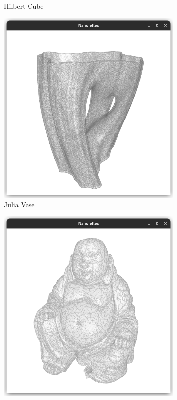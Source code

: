 \documentclass{stdlocal}
\begin{document}
\begin{figure}[t]
\begin{subfigure}[b]{0.23\linewidth}
      \caption{Hilbert Cube}
    \end{subfigure}
    \hfill
    \begin{subfigure}[b]{0.23\linewidth}
      \centering
      \includegraphics[width=\linewidth,trim={25px 20 25 50},clip]{images/polyhedral-surface-julia-vase.png}
      \caption{Julia Vase}
    \end{subfigure}
    \hfill
    \begin{subfigure}[b]{0.23\linewidth}
      \centering
      \includegraphics[width=\linewidth,trim={25px 20 25 50},clip]{images/polyhedral-surface-buddha.png}

\end{subfigure}
\end{figure}
\end{document}
